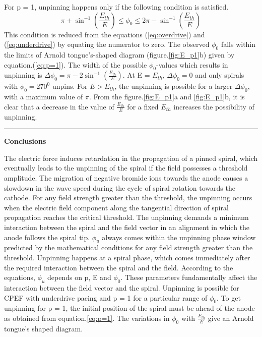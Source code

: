 \documentclass[%
 preprint,
 amsmath,amssymb,
 aps,
]{revtex4-2}
\begin{document}
For p = 1, unpinning happens only if the following condition is satisfied.
\begin{equation}
\pi+ \sin^{-1}(\frac{E_{th}}{E})  \leq \phi_0 \leq 2\pi-\sin^{-1}(\frac{E_{th}}{E})
\label{eq:p=1}
\end{equation}
This condition is reduced from the equations (\ref{eq:overdrive}) and (\ref{eq:underdrive}) by equating the numerator to zero. The observed $\phi_0$ falls within the limits of Arnold tongue's-shaped diagram (figure.\ref{fig:E_p1}b) given by equation.(\ref{eq:p=1}).
The width of the possible $\phi_0$-values which results in unpinning is $\Delta\phi_0 = \pi - 2 \sin^{-1}(\frac{E_{th}}{E})$. At E = $E_{th}$, $\Delta\phi_0 = 0$ and only spirals with $\phi_0 = 270^0$ unpins. For $E > E_{th}$, the unpinning is possible for a larger $\Delta\phi_0$, with a maximum value of $\pi$.  
From the figure.\ref{fig:E_p1}a and \ref{fig:E_p1}b, it is clear that a decrease in the value of $\frac{E_{th}}{E}$ for a fixed $E_{th}$ increases the possibility of unpinning.




\vspace{5pt}
\hrule
\vspace{5pt}
\textbf{Conclusions}

The electric force induces retardation in the propagation of a pinned spiral, which eventually leads to the unpinning of the spiral if the field possesses a threshold amplitude. 
The migration of negative bromide ions towards the anode causes a slowdown in the wave speed during the cycle of spiral rotation towards the cathode.
For any field strength greater than the threshold, the unpinning occurs when the electric field component along the tangential direction of spiral propagation reaches the critical threshold.
The unpinning demands a minimum interaction between the spiral and the field vector in an alignment in which the anode follows the spiral tip.
$\phi_u$ always comes within the unpinning phase window predicted by the mathematical conditions for any field strength greater than the threshold. Unpinning happens at a spiral phase, which comes immediately after the required interaction between the spiral and the field.
According to the equations, $\phi_u$ depends on p, E and $\phi_0$. These parameters fundamentally affect the interaction between the field vector and the spiral. 
Unpinning is possible for CPEF with underdrive pacing and p = 1 for a particular range of $\phi_0$. To get unpinning for p = 1, the initial position of the spiral must be ahead of the anode as obtained from equation.\ref{eq:p=1}.  The variations in $\phi_0$ with $\frac{E_{th}}{E}$ give an Arnold tongue's shaped diagram. 
\end{document}
